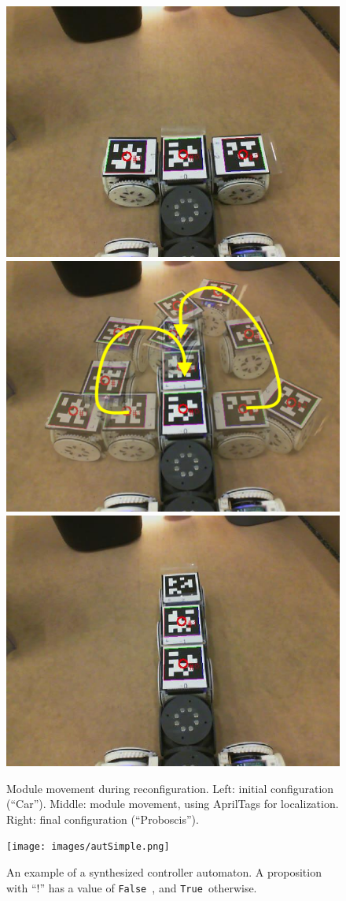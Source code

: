 \documentclass[12pt]{article}
\newcommand{\lt}{{\tt True }}
\newcommand{\lf}{{\tt False }}
\begin{document}
\begin{figure}[t]
\begin{center}
  \includegraphics[width=0.32\columnwidth]{images/reconf_start.jpg}
  \includegraphics[width=0.32\columnwidth]{images/reconf_motion.png}
  \includegraphics[width=0.32\columnwidth]{images/reconf_end.jpg}
  \caption{Module movement during reconfiguration. Left: initial configuration (``Car''). Middle: module movement, using AprilTags for localization. Right: final configuration (``Proboscis'').}
  \label{fig:reconf}
\end{center}
\end{figure}

\begin{figure}
\begin{center}
\texttt{[image: images/autSimple.png]}
\caption{An example of a synthesized controller automaton. A proposition with ``!'' has a value of \lf, and \lt otherwise.}
\label{fig:autSimple}
\end{center}
\end{figure}
\end{document}
